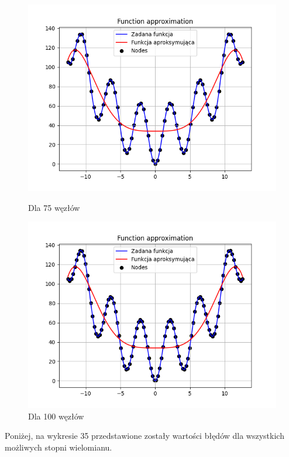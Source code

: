 \documentclass{article}
\begin{document}
\begin{figure}[H]
\begin{minipage}[b]{0.49\textwidth}
    \begin{minipage}[b]{\textwidth}
      \includegraphics[width=\textwidth]{img33.png}
      \caption{Dla 75 węzłów}
    \end{minipage}
    \vspace*{\fill}
    \begin{minipage}[b]{\textwidth}
      \includegraphics[width=\textwidth]{img34.png}
      \caption{Dla 100 węzłów}
    \end{minipage}
  \end{minipage}
\end{figure}

Poniżej, na wykresie 35 przedstawione zostały wartości błędów dla wszystkich możliwych stopni wielomianu.
\end{document}
